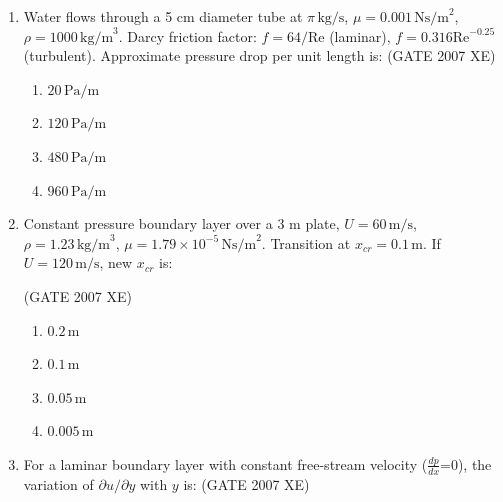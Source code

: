 \documentclass[journal,cmex10]{IEEEtran}
\theoremstyle{remark}
\numberwithin{equation}{enumi}
\numberwithin{figure}{enumi}
\begin{document}
\begin{enumerate}

\item Water flows through a 5 cm diameter tube at $\pi\,\text{kg/s}$, $\mu=0.001\,\text{Ns/m}^2$, $\rho = 1000\,\text{kg/m}^3$. Darcy friction factor: $f=64/\text{Re}$ (laminar), $f=0.316 \text{Re}^{-0.25}$ (turbulent). Approximate pressure drop per unit length is:  
\hfill{(GATE 2007 XE)}
\begin{multicols}{4}
\begin{enumerate}
    \item $20\,\text{Pa/m}$
    \item $120\,\text{Pa/m}$
    \item $480\,\text{Pa/m}$
    \item $960\,\text{Pa/m}$
\end{enumerate}
\end{multicols}

\item Constant pressure boundary layer over a 3 m plate, $U=60\,\text{m/s}$, $\rho=1.23\,\text{kg/m}^3$, $\mu=1.79 \times 10^{-5}\,\text{Ns/m}^2$. Transition at $x_{cr}=0.1\,\text{m}$. If $U=120\,\text{m/s}$, new $x_{cr}$ is:

\hfill{(GATE 2007 XE)}
\begin{multicols}{4}
\begin{enumerate}
    \item $0.2\,\text{m}$
    \item $0.1\,\text{m}$
    \item $0.05\,\text{m}$
    \item $0.005\,\text{m}$
\end{enumerate}
\end{multicols}

\item For a laminar boundary layer with constant free-stream velocity ($\frac{dp}{dx}$=0), the variation of $\partial u / \partial y$ with $y$ is:  
\hfill{(GATE 2007 XE)}


\end{enumerate}
\end{document}
